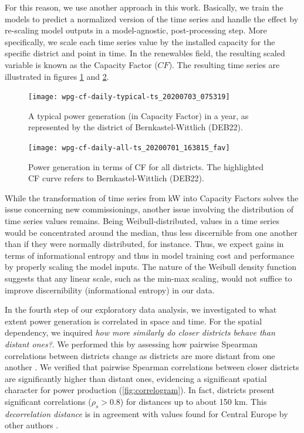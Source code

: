 For this reason, we use another approach in this work.
Basically, we train the models to predict a normalized version of the time series and handle the effect by re-scaling model outputs in a model-agnostic, post-processing step.
More specifically, we scale each time series value by the installed capacity for the specific district and point in time.
In the renewables field, the resulting scaled variable is known as the Capacity Factor ($CF$).
The resulting time series are illustrated in figures \ref{fig:deb22_production_2015_cf} and \ref{fig:all_cf}.

\begin{figure}[H]%
   \centering
    \caption{A typical power generation (in Capacity Factor) in a year, as represented by the district of Bernkastel-Wittlich (DEB22).}
    \texttt{[image: wpg-cf-daily-typical-ts\_20200703\_075319]}
   \label{fig:deb22_production_2015_cf}
\end{figure}

\begin{figure}[H]%
   \centering
    \caption{Power generation in terms of CF for all districts. The highlighted CF curve refers to Bernkastel-Wittlich (DEB22).}
    \texttt{[image: wpg-cf-daily-all-ts\_20200701\_163815\_fav]}
   \label{fig:all_cf}
\end{figure}

While the transformation of time series from kW into Capacity Factors solves the issue concerning new commissionings, another issue involving the distribution of time series values remains.
Being Weibull-distributed, values in a time series would be concentrated around the median, thus less discernible from one another than if they were normally distributed, for instance.
Thus, we expect gains in terms of informational entropy and thus in model training cost and performance by properly scaling the model inputs.
The nature of the Weibull density function suggests that any linear scale, such as the min-max scaling, would not suffice to improve discernibility (informational entropy) in our data.

In the fourth step of our exploratory data analysis, we investigated to what extent power generation is correlated in space and time.
For the spatial dependency, we inquired \textit{how more similarly do closer districts behave than distant ones?}.
We performed this by assessing how pairwise Spearman correlations between districts change as districts are more distant from one another \cite{engeland2017variability}.
We verified that pairwise Spearman correlations between closer districts are significantly higher than distant ones, evidencing a significant spatial character for power production (\ref{fig:correlogram}).
In fact, districts present significant correlations ($\rho_s>0.8$) for distances up to about 150 km.
This \textit{decorrelation distance} is in agreement with values found for Central Europe by other authors \cite{engeland2017variability}.

